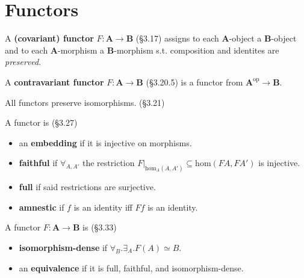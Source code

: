 \documentclass[10pt,twocolumn,letterpaper]{article}
\newcommand{\defn}[1]{{\bf #1}}
\begin{document}
\section{Functors}

  A \defn{(covariant) functor} $F : \mathbf{A} \to \mathbf{B}$ (\S3.17)
  assigns to each $\mathbf{A}$-object a $\mathbf{B}$-object and to each
  $\mathbf{A}$-morphism a $\mathbf{B}$-morphism s.t. composition and
  identites are {\em preserved}.

  A \defn{contravariant functor} $F : \mathbf{A} \to \mathbf{B}$ (\S3.20.5)
  is a functor from $\mathbf{A}^\text{op} \to \mathbf{B}$.

  All functors preserve isomorphisms. (\S3.21)

  A functor is (\S3.27)
  \begin{itemize}
    \item an \defn{embedding} if it is injective on morphisms.
    \item \defn{faithful} if $\forall_{A,A'}$ the restriction $F\vert_{\mbox{hom}_A(A,A')}
      \subseteq \mbox{hom}(FA, FA')$ is injective.
    \item \defn{full} if said restrictions are surjective.
    \item \defn{amnestic} if $f$ is an identity iff $Ff$ is an identity.
  \end{itemize}

  A functor $F : \mathbf{A} \to \mathbf{B}$ is (\S3.33)
  \begin{itemize}  
    \item \defn{isomorphism-dense} if $\forall_B . \exists_A . F(A) \simeq B$.
    \item an \defn{equivalence} if it is full, faithful, and
      isomorphism-dense.
  \end{itemize}
\end{document}
